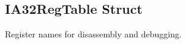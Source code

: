 \subsection{IA32RegTable Struct}
\label{structDyninst_1_1InstructionAPI_1_1IA32RegTable}


Register names for disassembly and debugging.  


